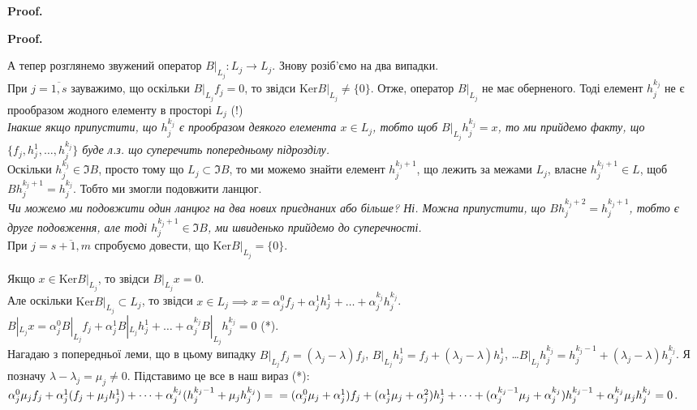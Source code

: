 \documentclass[a4paper, 10pt]{article}
\makeatletter
\def\qed{$\blacksquare$}
\def\ker#1{\textrm{Ker} {#1}}
\theoremstyle{theoremdd}
\theoremstyle{theoremdd}
\theoremstyle{theoremdd}
\theoremstyle{theoremdd}
\theoremstyle{theoremdd}
\theoremstyle{theoremdd}
\theoremstyle{theoremdd}
\theoremstyle{theoremdd}
\renewenvironment{proof}[1][Proof.\\]{\par
\pushQED{\hfill \qed}%
\normalfont \topsep6\p@\@plus6\p@\relax
\trivlist
\item\relax
{\bfseries
#1\@addpunct{.}}\hspace\labelsep\ignorespaces
}{%
\popQED\endtrivlist\@endpefalse
}
\makeatother
\begin{document}
\begin{proof}
\begin{proof}
А тепер розглянемо звужений оператор $B|_{L_j}: L_j \to L_j$. Знову розіб'ємо на два випадки.\\
При $j=\overline{1,s}$ зауважимо, що оскільки $B|_{L_j}f_j = 0$, то звідси $\ker B|_{L_j} \neq \{0\}$. Отже, оператор $B|_{L_j}$ не має оберненого. Тоді елемент $h_j^{k_j}$ не є прообразом жодного елементу в просторі $L_j$ (!)\\
\textit{Інакше якщо припустити, що $h_j^{k_j}$ є прообразом деякого елемента $x \in L_j$, тобто щоб $B|_{L_j}h_j^{k_j} = x$, то ми прийдемо факту, що $\{f_j,h_j^1,\dots,h_j^{k_j}\}$ буде л.з. що суперечить попередньому підрозділу.}\\
Оскільки $h_j^{k_j} \in \Im B$, просто тому що $L_j \subset \Im B$, то ми можемо знайти елемент $h_j^{k_j+1}$, що лежить за межами $L_j$, власне $h_j^{k_j+1} \in L$, щоб $Bh_j^{k_j+1} = h_j^{k_j}$. Тобто ми змогли подовжити ланцюг.\\
\textit{Чи можемо ми подовжити один ланцюг на два нових приєднаних або більше? Ні. Можна припустити, що $Bh_j^{k_j+2} = h_j^{k_j+1}$, тобто є друге подовження, але тоді $h_j^{k_j+1} \in \Im B$, ми швиденько прийдемо до суперечності.}
\bigskip \\
При $j=\overline{s+1,m}$ спробуємо довести, що $\ker B|_{L_j} = \{0\}$.
\iffalse
$x \in \ker B|{L_j} \implies B|_{L_j} x = 0 \implies Bx = 0 \implies Ax = \lambda x$, тобто $x$ - власний вектор для числа $\lambda$. А оскільки $L_j$ не містить власних векторів для $\lambda$, то звідси $x = 0$.\\
Це означає, що існує $(B|_{L_j})^{-1}$. А тому будь-який елемент $L_j$ при дії $B|_{L_j}$ має прообраз з $L_j$. А це означає, що $h_{s+1}^{k_{s+1}},\dots,h_m^{k_m}$ не мають продовження за межами $L_{s+1},\dots,L_m$.
\fi
Якщо $x \in \ker B|_{L_j}$, то звідси $B|_{L_j}x = 0$.\\
Але оскільки $\ker B|_{L_j} \subset L_j$, то звідси $x \in L_j \implies x = \alpha_j^0 f_j + \alpha_j^1 h_j^1 + \dots + \alpha_j^{k_j}h_j^{k_j}$.\\
$B|_{L_j}x = \alpha_j^0 B|_{L_j}f_j + \alpha_j^1 B|_{L_j}h_j^1 + \dots + \alpha_j^{k_j} B|_{L_j}h_j^{k_j} = 0$ (*).\\
Нагадаю з попередньої леми, що в цьому випадку $B|_{L_j}f_j = (\lambda_j-\lambda)f_j$, $B|_{L_j}h_j^1 = f_j + (\lambda_j - \lambda)h_j^1$, \dots $B|_{L_j}h_j^{k_j} = h_j^{k_j-1} + (\lambda_j - \lambda)h_j^{k_j}$. Я позначу $\lambda-\lambda_j = \mu_j \neq 0$. Підставимо це все в наш вираз (*):
$\alpha_j^0 \mu_j f_j + \alpha_j^1 (f_j+\mu_j h_j^1) + \dots + \alpha_j^{k_j} (h_j^{k_j-1}+\mu_j h_j^{k_j}) = \\ =(\alpha_j^0 \mu_j + \alpha_j^1) f_j + (\alpha_j^1 \mu_j + \alpha_j^2) h_j^1 + \dots + (\alpha_j^{k_j-1}\mu_j + \alpha_j^{k_j})h_j^{k_j-1} + \alpha_j^{k_j} \mu_j h_j^{k_j} = 0$.\\

\end{proof}
\end{proof}
\end{document}

